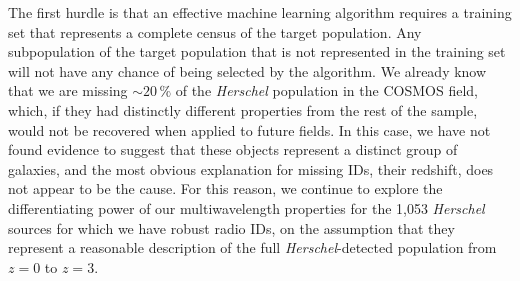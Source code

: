 The first hurdle is that an effective machine learning algorithm requires a training set that represents a complete census of the target population. Any subpopulation of the target population that is not represented in the training set will not have any chance of being selected by the algorithm. We already know that we are missing $\sim20\,\%$ of the \textit{Herschel} population in the COSMOS field, which, if they had distinctly different properties from the rest of the sample, would not be recovered when applied to future fields. In this case, we have not found evidence to suggest that these objects represent a distinct group of galaxies, and the most obvious explanation for missing IDs, their redshift, does not appear to be the cause. For this reason, we continue to explore the differentiating power of our multiwavelength properties for the 1,053 \textit{Herschel} sources for which we have robust radio IDs, on the assumption that they represent a reasonable description of the full \textit{Herschel}-detected population from $z = 0$ to $z = 3$.
